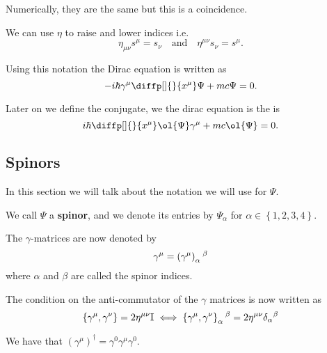 \documentclass[12pt, a4paper]{article}
\begin{document}
\begin{mdnote}
    Numerically, they are the same but this is a coincidence.
\end{mdnote}

\begin{mdcor}
    We can use \(\eta\) to raise and lower indices i.e.
    \[\eta_{\mu\nu} s^{\mu}= s_\nu \quad\text{and}\quad \eta^{\mu\nu} s_{\nu} =s^{\mu}.\]
\end{mdcor}

\begin{mdprop}
    Using this notation the Dirac equation is written as 
    \[-i\hbar \gamma^{\mu}\diffp[]{}{{x^\mu}}\Psi+mc\Psi=0.\]
\end{mdprop}

\begin{mdnote}
    Later on we define the conjugate, we the dirac equation is the is 
    \[i\hbar \diffp[]{}{{x^\mu}}\ol{\Psi}\gamma^{\mu}+mc\ol{\Psi}=0.\]
\end{mdnote}

\subsection{Spinors}

In this section we will talk about the notation we will use for \(\Psi\).

\begin{definition}
    We call \(\Psi\) a \textbf{spinor}, and we denote its entries by \(\Psi_{\alpha}\) for \(\alpha \in \left\{ 1,2,3,4 \right\}\).
\end{definition}

\begin{definition}
    The \(\gamma\)-matrices are now denoted by 
    \[\gamma^{\mu} = \left( \gamma^{\mu} \right)_{\alpha}\mkern0.5mu^{\beta}\]
    where \(\alpha\) and \(\beta\) are called the spinor indices.
\end{definition}

\begin{theorem}
    The condition on the anti-commutator of the \(\gamma\) matrices is now written as 
    \[\left\{ \gamma^{\mu},\gamma^\nu \right\} =2\eta^{\mu\nu}\mathbb{I} \iff \left\{ \gamma^{\mu},\gamma^\nu \right\}_{\alpha}\mkern0.5mu^{\beta} =2\eta^{\mu\nu}\delta_{\alpha}\mkern0.5mu^{\beta}\]
\end{theorem}

\begin{theorem}
    We have that \((\gamma^\mu)^\dagger = \gamma^0 \gamma^\mu \gamma^0\).
\end{theorem}
\end{document}
